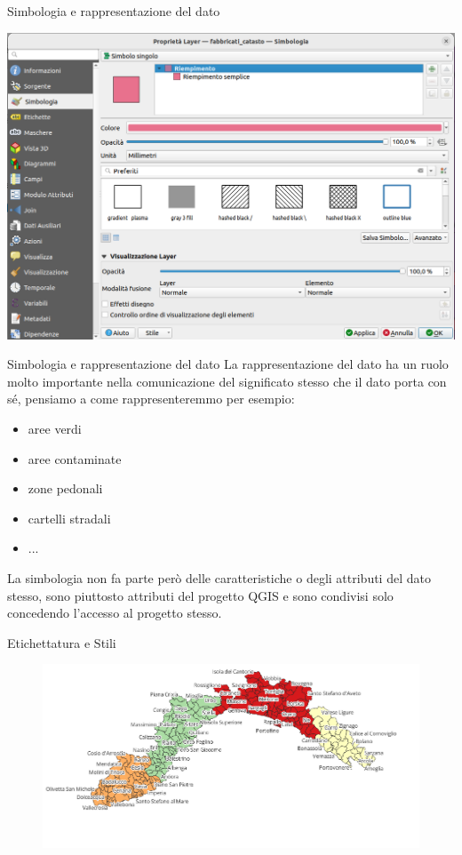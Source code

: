 \documentclass{beamer}
\begin{document}
{\begin{frame}{Simbologia e rappresentazione del dato}
    \begin{center}
        \includegraphics[width=.95\textwidth]{digitizing_pics/SImbologia del 2022-10-12 10-05-05.png}
    \end{center}
\end{frame}

\begin{frame}{Simbologia e rappresentazione del dato}
    La rappresentazione del dato ha un ruolo molto importante nella comunicazione del significato stesso che il dato porta con sé, pensiamo a come rappresenteremmo per esempio:
    \begin{itemize}
        \item aree verdi
        \item aree contaminate
        \item zone pedonali
        \item cartelli stradali
        \item ...
    \end{itemize}

    La simbologia non fa parte però delle caratteristiche o degli attributi del dato stesso, sono piuttosto attributi del progetto QGIS e sono condivisi solo concedendo l'accesso al progetto stesso.
\end{frame}

\begin{frame}{Etichettatura e Stili}
\begin{figure}
    \centering
    \includegraphics[width=1\linewidth]{immagine.png}
   

\end{figure}
\end{frame}}
\end{document}
